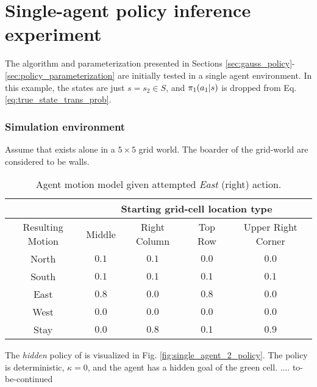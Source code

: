 \section{Single-agent policy inference experiment}
    The algorithm and parameterization presented in Sections \ref{sec:gauss_policy}-\ref{sec:policy_parameterization}
    are initially tested in a single agent environment. In this example, the states are just $s=s_2 \in S$, and
    $\pi_{1}(a_1|s)$ is dropped from Eq. \ref{eq:true_state_trans_prob}.

    \subsubsection{Simulation environment}
    Assume that  exists alone in a $5\times5$ grid world. The boarder of the grid-world are considered to be
    walls.

    \begin{table}[h!]
    \centering
    \begin{tabular}{ c || c | c | c | c}
              & \multicolumn{4}{|c}{Starting grid-cell location type}\\
        \hline
        Resulting Motion & Middle & Right Column & Top Row & Upper Right Corner\\
        \hline
        North & $0.1$ & $0.1$ & $0.0$ & $0.0$ \\
        South & $0.1$ & $0.1$ & $0.1$ & $0.1$ \\
        East  & $0.8$ & $0.0$ & $0.8$ & $0.0$ \\
        West  & $0.0$ & $0.0$ & $0.0$ & $0.0$ \\
        Stay  & $0.0$ & $0.8$ & $0.1$ & $0.9$ \\
    \end{tabular}
    \label{table:motion_model}
    \caption{Agent motion model given attempted \textit{East} (right) action.}
    \end{table}

    The \textit{hidden} policy of  is visualized in Fig. \ref{fig:single_agent_2_policy}. The policy is
    deterministic, $\kappa=0$, and the agent has a hidden goal of the green cell. .... to-be-continued


    \begin{figure}[htb]
        \begin{center}
        \end{center}
    \end{figure}
